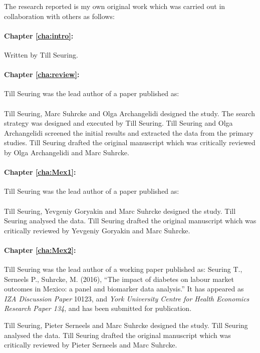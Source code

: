 The research reported is my own original work which was carried out in collaboration with
others as follows:

\paragraph{Chapter \ref{cha:intro}:} Written by Till Seuring. 

\paragraph{Chapter \ref{cha:review}:} Till Seuring was the lead author of a paper published as:
\\[12pt]
\noindent{}
\\[12pt]
\noindent Till Seuring, Marc Suhrcke and Olga Archangelidi designed the study. The search strategy was designed and executed by Till Seuring. Till Seuring and Olga Archangelidi screened the initial results and extracted the data from the primary studies. Till Seuring drafted the original manuscript which was critically reviewed by Olga Archangelidi and Marc Suhrcke.

\paragraph{Chapter \ref{cha:Mex1}:} Till Seuring was the lead author of a paper published as:
\\[12pt]
\noindent{}
\\[12pt]
\noindent Till Seuring, Yevgeniy Goryakin and Marc Suhrcke  designed the study. Till Seuring analysed the data. Till Seuring drafted the original manuscript which was critically reviewed by Yevgeniy Goryakin and Marc Suhrcke.


\paragraph{Chapter \ref{cha:Mex2}:} Till Seuring was the lead author of a working paper published as: 
Seuring T., Serneels P., Suhrcke, M. (2016), ``The impact of diabetes on labour market outcomes in Mexico: a panel and biomarker data analysis.'' It has appeared as \textit{IZA Discussion Paper} 10123, and \textit{York University Centre for Health Economics Research Paper 134}, and has been submitted for publication.

Till Seuring, Pieter Serneels and Marc Suhrcke designed the study. Till Seuring analysed the data. Till Seuring drafted the original manuscript which was critically reviewed by Pieter Serneels and Marc Suhrcke.



